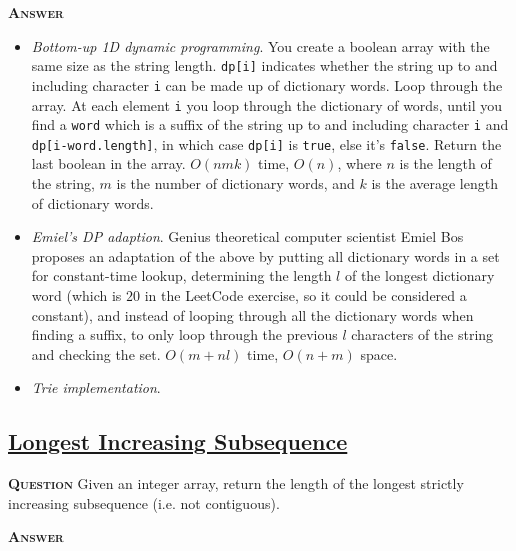 \documentclass[table, xcdraw]{article}%
\begin{document}
\textsc{\textbf{Answer}}

\begin{itemize}
    \item \textit{Bottom-up 1D dynamic programming}. You create a boolean array with the same size as the string length. \texttt{dp[i]} indicates whether the string up to and including character \texttt{i} can be made up of dictionary words. Loop through the array. At each element \texttt{i} you loop through the dictionary of words, until you find a \texttt{word} which is a suffix of the string up to and including character \texttt{i} and \texttt{dp[i-word.length]}, in which case \texttt{dp[i]} is \texttt{true}, else it's \texttt{false}. Return the last boolean in the array. $O(nmk)$ time, $O(n)$, where $n$ is the length of the string, $m$ is the number of dictionary words, and $k$ is the average length of dictionary words.
    \item \textit{Emiel's DP adaption}. Genius theoretical computer scientist Emiel Bos proposes an adaptation of the above by putting all dictionary words in a set for constant-time lookup, determining the length $l$ of the longest dictionary word (which is $20$ in the LeetCode exercise, so it could be considered a constant), and instead of looping through all the dictionary words when finding a suffix, to only loop through the previous $l$ characters of the string and checking the set. $O(m+nl)$ time, $O(n+m)$ space.
    \item \textit{Trie implementation}.
\end{itemize}

\subsection{\href{https://leetcode.com/problems/longest-increasing-subsequence}{Longest Increasing Subsequence}}

\textsc{\textbf{Question}} Given an integer array, return the length of the longest strictly increasing subsequence (i.e. not contiguous).

\textsc{\textbf{Answer}}
\end{document}
